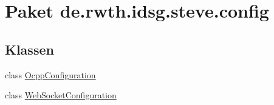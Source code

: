 \hypertarget{namespacede_1_1rwth_1_1idsg_1_1steve_1_1config}{\section{Paket de.\+rwth.\+idsg.\+steve.\+config}
\label{namespacede_1_1rwth_1_1idsg_1_1steve_1_1config}
}
\subsection*{Klassen}
\begin{DoxyCompactItemize}
\item 
class \hyperlink{classde_1_1rwth_1_1idsg_1_1steve_1_1config_1_1_ocpp_configuration}{Ocpp\+Configuration}
\item 
class \hyperlink{classde_1_1rwth_1_1idsg_1_1steve_1_1config_1_1_web_socket_configuration}{Web\+Socket\+Configuration}
\end{DoxyCompactItemize}
